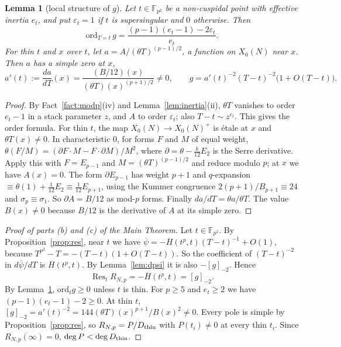 \documentclass[11pt,a4paper]{article}
\numberwithin{equation}{section}
\newtheorem{lemma}[theorem]{Lemma}
\theoremstyle{definition}
\theoremstyle{remark}
\newcommand{\Fq}{\mathbb F_{p^2}}
\newcommand{\Res}{\operatorname{Res}}
\begin{document}
\begin{lemma}[local structure of $g$]\label{lem:g}
Let $t\in\Fq$ be a non-cuspidal point with effective inertia $e_t$, and put $\varepsilon_t=1$ if
$t$ is supersingular and $0$ otherwise. Then
\[
\mathrm{ord}_{T=t}\,g=\frac{(p-1)(e_t-1)-2\varepsilon_t}{e_t}.
\]
For thin $t$ and $x$ over $t$, let $a=A/(\theta T)^{(p-1)/2}$, a function on $X_0(N)$ near $x$.
Then $a$ has a simple zero at $x$,
\[
a'(t):=\frac{da}{dT}(x)=\frac{(B/12)(x)}{(\theta T)(x)^{(p+1)/2}}\ne0,
\qquad g=a'(t)^{-2}(T-t)^{-2}\bigl(1+O(T-t)\bigr).
\]
\end{lemma}
\begin{proof}
By Fact~\ref{fact:modp}(iv) and Lemma~\ref{lem:inertia}(ii), $\theta T$ vanishes to order $e_t-1$ in a
stack parameter $z$, and $A$ to order $\varepsilon_t$; also $T-t\sim z^{e_t}$. This gives the order formula.
For thin $t$, the map $X_0(N)\to X_0(N)^+$ is \'etale at $x$ and $\theta T(x)\ne0$. In
characteristic $0$, for forms $F$ and $M$ of equal weight,
$\theta(F/M)=(\partial F\cdot M-F\cdot\partial M)/M^2$, where $\partial=\theta-\frac{k}{12}E_2$ is the
Serre derivative. Apply this with $F=E_{p-1}$ and $M=(\theta T)^{(p-1)/2}$ and reduce modulo $p$; at
$x$ we have $A(x)=0$. The form $\partial E_{p-1}$ has weight $p+1$ and $q$-expansion
$\equiv\theta(1)+\frac1{12}E_2\equiv\frac1{12}E_{p+1}$, using the Kummer congruence
$2(p+1)/B_{p+1}\equiv24$ and $\sigma_p\equiv\sigma_1$. So $\partial A=B/12$ as mod-$p$ forms. Finally
$da/dT=\theta a/\theta T$. The value $B(x)\ne0$ because $B/12$ is the derivative of $A$ at its simple zero.
\end{proof}

\begin{proof}[Proof of parts (b) and (c) of the Main Theorem]
Let $t\in\Fq$. By Proposition~\ref{prop:res}, near $t$ we have
$\overline\psi=-\overline H(t^p,t)(T-t)^{-1}+O(1)$, because $T^{p^2}-T=-(T-t)(1+O(T-t))$. So the
coefficient of $(T-t)^{-2}$ in $d\overline\psi/dT$ is $\overline H(t^p,t)$. By Lemma~\ref{lem:dpsi}
it is also $-[g]_{-2}$. Hence
\[
\Res_tR_{N,p}=-\overline H(t^p,t)=[g]_{-2}.
\]
By Lemma~\ref{lem:g}, $\mathrm{ord}_tg\ge0$ unless $t$ is thin. For $p\ge5$ and $e_t\ge2$ we have
$(p-1)(e_t-1)-2\ge0$. At thin $t$, $[g]_{-2}=a'(t)^{-2}=144(\theta T)(x)^{p+1}/B(x)^2\ne0$. Every pole is
simple by Proposition~\ref{prop:res}, so $R_{N,p}=P/D_{\rm thin}$ with $P(t_i)\ne0$ at every thin
$t_i$. Since $R_{N,p}(\infty)=0$, $\deg P<\deg D_{\rm thin}$.
\end{proof}
\end{document}

